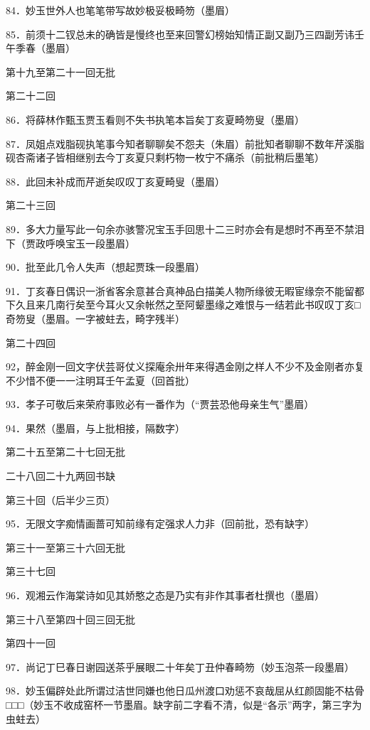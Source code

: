 84．妙玉世外人也笔笔带写故妙极妥极畸笏{（\kaishu 墨眉）}

85．前须十二钗总未的确皆是慢终也至来回警幻榜始知情正副又副乃三四副芳讳壬午季春{（\kaishu 墨眉）}

第十九至第二十一回无批

第二十二回

86．将薛林作甄玉贾玉看则不失书执笔本旨矣丁亥夏畸笏叟{（\kaishu 墨眉）}

87．凤姐点戏脂砚执笔事今知者聊聊矣不怨夫（朱眉）前批知者聊聊不数年芹溪脂砚杏斋诸子皆相继别去今丁亥夏只剩朽物一枚宁不痛杀{（\kaishu 前批稍后墨笔）}

88．此回未补成而芹逝矣叹叹丁亥夏畸叟{（\kaishu 墨眉）}

第二十三回

89．多大力量写此一句余亦骇警况宝玉手回思十二三时亦会有是想时不再至不禁泪下{（\kaishu 贾政呼唤宝玉一段墨眉）}

90．批至此几令人失声{（\kaishu 想起贾珠一段墨眉）}

91．丁亥春日偶识一浙省客余意甚合真神品白描美人物所缘彼无暇宦缘奈不能留都下久且来几南行矣至今耳火又余帐然之至阿颦墨缘之难恨与一结若此书叹叹丁亥□奇笏叟{（\kaishu 墨眉。一字被蛀去，畸字残半）}

第二十四回

92，醉金刚一回文字伏芸哥仗义探庵余卅年来得遇金刚之样人不少不及金刚者亦复不少惜不便一一注明耳壬午孟夏{（\kaishu 回首批）}

93．孝子可敬后来荣府事败必有一番作为{（\kaishu ``贾芸恐他母亲生气''墨眉）}

94．果然{（\kaishu 墨眉，与上批相接，隔数字）}

第二十五至第二十七回无批

二十八回二十九两回书缺

第三十回（后半少三页）

95．无限文字痴情画蔷可知前缘有定强求人力非{（\kaishu 回前批，恐有缺字）}

第三十一至第三十六回无批

第三十七回

96．观湘云作海棠诗如见其娇憨之态是乃实有非作其事者杜撰也{（\kaishu 墨眉）}

第三十八至第四十回三回无批

第四十一回

97．尚记丁巳春日谢园送茶乎展眼二十年矣丁丑仲春畸笏{（\kaishu 妙玉泡茶一段墨眉）}

98．妙玉偏辟处此所谓过洁世同嫌也他日瓜州渡口劝惩不哀哉屈从红颜固能不枯骨□□□{（\kaishu 妙玉不收成窑杯一节墨眉。缺字前二字看不清，似是``各示''两字，第三字为虫蛀去）}

